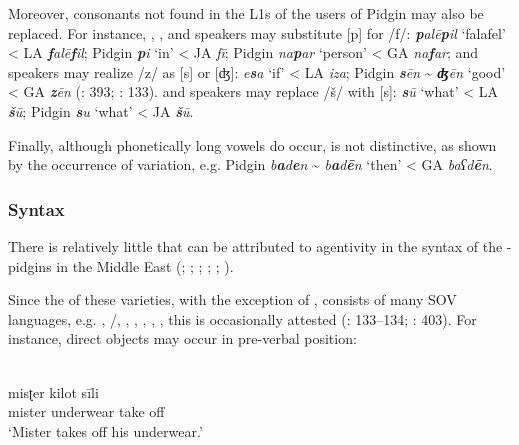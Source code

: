 \documentclass[output=paper]{langsci/langscibook}
\begin{document}
  Moreover, consonants not found in the L1s of the users of  Pidgin  may also be replaced. For instance, , ,  and  speakers may substitute [p] for /f/:  \textit{\textbf{p}alē\textbf{p}il} ‘falafel’ < LA \textit{\textbf{f}alē\textbf{f}il};  Pidgin  \textit{\textbf{p}i} ‘in’ < JA \textit{fī};  Pidgin  \textit{na\textbf{p}ar} ‘person’ < GA \textit{na\textbf{f}ar};  and  speakers may realize /z/ as [s] or [ʤ]:  \textit{e\textbf{s}a} ‘if’ < LA \textit{iza};  Pidgin  \textit{\textbf{s}ēn} {\textasciitilde} \textit{\textbf{ʤ}ēn} ‘good’ < GA \textit{\textbf{z}ēn} (\citealt{Bizri2014}: 393; \citealt{Avram2017article}: 133).  and  speakers may replace /š/ with [s]:  \textit{\textbf{s}ū} ‘what’ < LA \textit{\textbf{š}ū};  Pidgin  \textit{\textbf{s}u} ‘what’ < JA \textit{\textbf{š}ū}.

Finally, although phonetically long vowels do occur,  is not distinctive, as shown by the occurrence of variation, e.g.  Pidgin  \textit{b\textbf{a}d\textbf{e}n} {\textasciitilde} \textit{b\textbf{a}d\textbf{ē}n} ‘then’ < GA \textit{baʕd\textbf{ē}n}. 


 \subsubsection{Syntax} 

There is relatively little that can be attributed to  agentivity in the syntax of the - pidgins in the Middle East (\citealt{Almoaily2013}; \citealt{Al-Salman2013}; \citealt{Avram2014Pidgin}; \citealt{Bizri2014}; \citealt{Avram2017article}; \citealt{Bakir2017}).

Since the  of these varieties, with the exception of  , consists of many SOV languages, e.g. , /, , , , , , this  is occasionally attested (\citealt{Avram2017article}: 133–134; \citealt{Bizri2014}: 403). For instance, direct objects may occur in pre-verbal position:                                                              


\ea
\ea {} \citep[227]{Bizri2010}\\
\gll     misʈer kilot sīli\\
         mister underwear take off\\
\glt       `Mister takes off his underwear.'     
\end{document}
